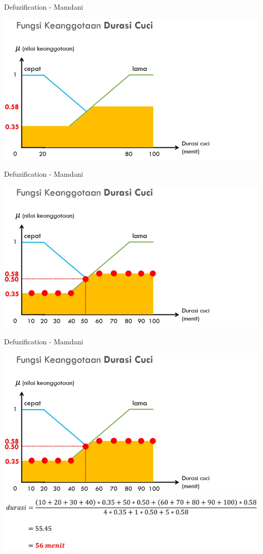 \documentclass[pdflatex,compress,mathserif]{beamer}
\begin{document}
\begin{frame}{Defuzification - Mamdani}
	\begin{center}
		\includegraphics[width=\linewidth]{img/44}
	\end{center}
\end{frame}

\begin{frame}{Defuzification - Mamdani}
	\begin{center}
		\includegraphics[width=\linewidth]{img/45}
	\end{center}
\end{frame}

\begin{frame}{Defuzification - Mamdani}
	\begin{center}
		\includegraphics[width=0.8\linewidth]{img/45}
		\includegraphics[width=\linewidth]{img/46}
	\end{center}
\end{frame}
\end{document}

